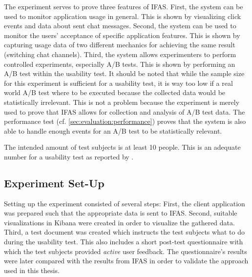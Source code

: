 The experiment serves to prove three features of \ac{IFAS}.
First, the system can be used to monitor application usage in general.
This is shown by visualizing click events and data about sent chat messages.
Second, the system can be used to monitor the users' acceptance of specific application features.
This is shown by capturing usage data of two different mechanics for achieving the same result (switching chat channels).
Third, the system allows experimenters to perform controlled experiments, especially A/B tests.
This is shown by performing an A/B test within the usability test.
It should be noted that while the sample size for this experiment is sufficient for a usability test, it is way too low if a real world A/B test where to be executed because the collected data would be statistically irrelevant.
This is not a problem because the experiment is merely used to prove that \ac{IFAS} allows for collection and analysis of A/B test data.
The performance test (cf. \cref{sec:evaluation:performance}) proves that the system is also able to handle enough events for an A/B test to be statistically relevant.

The intended amount of test subjects is at least 10 people.
This is an adequate number for a usability test as reported by \citet{Turner2006}.

%

\subsection{Experiment Set-Up}

Setting up the experiment consisted of several steps:
First, the client application was prepared such that the appropriate data is sent to \ac{IFAS}.
Second, suitable visualizations in Kibana were created in order to visualize the gathered data.
Third, a test document was created which instructs the test subjects what to do during the usability test.
This also includes a short post-test questionnaire with which the test subjects provided \emph{active} user feedback.
The questionnaire's results were later compared with the results from \ac{IFAS} in order to validate the approach used in this thesis.

